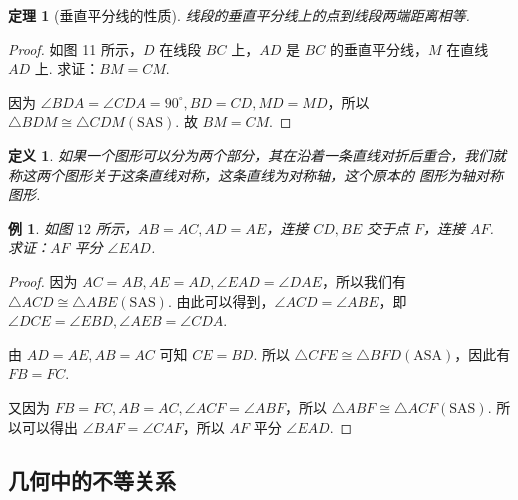 \documentclass[a4paper]{article}
\newtheorem{theorem}{定理}[section]
\newtheorem{exam}{例}[subsection]
\newtheorem{definition}{定义}[section]
\begin{document}
\begin{theorem}[垂直平分线的性质]
    线段的垂直平分线上的点到线段两端距离相等.
\end{theorem}

\begin{proof}
    如图 11 所示，$D$ 在线段 $BC$ 上，$AD$ 是 $BC$ 的垂直平分线，$M$ 在直线 $AD$ 上. 求证：$BM=CM$.

    因为 $\angle BDA=\angle CDA=90^\circ,BD=CD,MD=MD$，所以 $\triangle BDM\cong \triangle CDM(\text{SAS})$. 
    故 $BM=CM$.
\end{proof}

\begin{definition}
    如果一个图形可以分为两个部分，其在沿着一条直线对折后重合，我们就称这两个图形关于这条直线对称，这条直线为对称轴，这个原本的
    图形为轴对称图形. 
\end{definition}

\begin{exam}
    如图 $12$ 所示，$AB=AC,AD=AE$，连接 $CD,BE$ 交于点 $F$，连接 $AF$. 求证：$AF$ 平分 $\angle EAD$.
\end{exam}

\begin{proof}
    因为 $AC=AB,AE=AD,\angle EAD=\angle DAE$，所以我们有 $\triangle ACD\cong \triangle ABE(\text{SAS})$. 
    由此可以得到，$\angle ACD=\angle ABE$，即 $\angle DCE=\angle EBD,\angle AEB=\angle CDA$.

    由 $AD=AE,AB=AC$ 可知 $CE=BD$. 所以 $\triangle CFE\cong \triangle BFD(\text{ASA})$，因此有 $FB=FC$.

    又因为 $FB=FC,AB=AC,\angle ACF=\angle ABF$，所以 $\triangle ABF\cong \triangle ACF(\text{SAS})$. 
    所以可以得出 $\angle BAF=\angle CAF$，所以 $AF$ 平分 $\angle EAD$.
\end{proof}

\subsection{几何中的不等关系}
\end{document}
